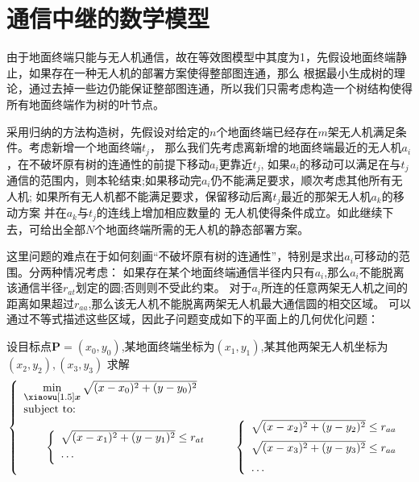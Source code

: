 \chapter{通信中继的数学模型}
\label{cha:com_model}
由于地面终端只能与无人机通信，故在等效图模型中其度为1，先假设地面终端静止，如果存在一种无人机的部署方案使得整部图连通，那么
根据最小生成树的理论，通过去掉一些边仍能保证整部图连通，所以我们只需考虑构造一个树结构使得所有地面终端作为树的叶节点。

采用归纳的方法构造树，先假设对给定的$n$个地面终端已经存在$m$架无人机满足条件。考虑新增一个地面终端$t_j$，
那么我们先考虑离新增的地面终端最近的无人机$a_i$，在不破坏原有树的连通性的前提下移动$a_i$更靠近$t_j$,
如果$a_i$的移动可以满足在与$t_j$通信的范围内，则本轮结束;如果移动完$a_i$仍不能满足要求，顺次考虑其他所有无人机;
如果所有无人机都不能满足要求，保留移动后离$t_j$最近的那架无人机$a_k$的移动方案
并在$a_k$与$t_j$的连线上增加相应数量的
无人机使得条件成立。如此继续下去，可给出全部$N$个地面终端所需的无人机的静态部署方案。

这里问题的难点在于如何刻画“不破坏原有树的连通性”，特别是求出$a_i$可移动的范围。分两种情况考虑：
如果存在某个地面终端通信半径内只有$a_i$,那么$a_i$不能脱离该通信半径$r_{at}$划定的圆;否则则不受此约束。
对于$a_i$所连的任意两架无人机之间的距离如果超过$r_{aa}$,那么该无人机不能脱离两架无人机最大通信圆的相交区域。
可以通过不等式描述这些区域，因此子问题变成如下的平面上的几何优化问题：
\begin{proposition}
设目标点$\bm{P}=(x_0,y_0)$,某地面终端坐标为$(x_1,y_1)$,某其他两架无人机坐标为$(x_2,y_2),(x_3,y_3)$
求解
\begin{equation}\label{bilevel}
\left\{\begin{array}{l}
\min\limits_{{\mbox{\footnotesize\boldmath $x$}}} \sqrt{(x-x_0)^2+(y-y_0)^2}\\[0.2cm]
\mbox{subject to:}\\[0.1cm]
\qquad \left\{\begin{array}{l}
        \sqrt{(x-x_1)^2+(y-y_1)^2}\le r_{at}\\[0.1cm]
        \dots \\[0.1cm]
      \end{array}\right.
\qquad \left\{
    \begin{array}{l}
    \sqrt{(x-x_2)^2+(y-y_2)^2}\le r_{aa}\\[0.2cm]    
    \sqrt{(x-x_3)^2+(y-y_3)^2}\le r_{aa}\\[0.2cm]
    \dots
    \end{array}\right.
\end{array}\right.
\end{equation}
\end{proposition}

